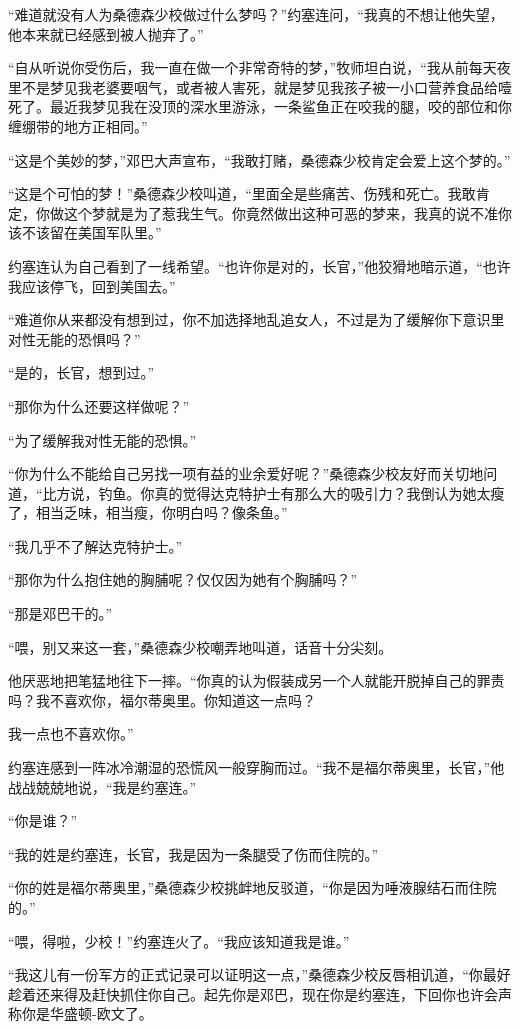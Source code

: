     “难道就没有人为桑德森少校做过什么梦吗？”约塞连问，“我真的不想让他失望，他本来就已经感到被人抛弃了。”

    “自从听说你受伤后，我一直在做一个非常奇特的梦，”牧师坦白说，“我从前每天夜里不是梦见我老婆要咽气，或者被人害死，就是梦见我孩子被一小口营养食品给噎死了。最近我梦见我在没顶的深水里游泳，一条鲨鱼正在咬我的腿，咬的部位和你缠绷带的地方正相同。”

    “这是个美妙的梦，”邓巴大声宣布，“我敢打赌，桑德森少校肯定会爱上这个梦的。”

    “这是个可怕的梦！”桑德森少校叫道，“里面全是些痛苦、伤残和死亡。我敢肯定，你做这个梦就是为了惹我生气。你竟然做出这种可恶的梦来，我真的说不准你该不该留在美国军队里。”

    约塞连认为自己看到了一线希望。“也许你是对的，长官，”他狡猾地暗示道，“也许我应该停飞，回到美国去。”

    “难道你从来都没有想到过，你不加选择地乱追女人，不过是为了缓解你下意识里对性无能的恐惧吗？”

    “是的，长官，想到过。”

    “那你为什么还要这样做呢？”

    “为了缓解我对性无能的恐惧。”

    “你为什么不能给自己另找一项有益的业余爱好呢？”桑德森少校友好而关切地问道，“比方说，钓鱼。你真的觉得达克特护士有那么大的吸引力？我倒认为她太瘦了，相当乏味，相当瘦，你明白吗？像条鱼。”

    “我几乎不了解达克特护士。”

    “那你为什么抱住她的胸脯呢？仅仅因为她有个胸脯吗？”

    “那是邓巴干的。”

    “喂，别又来这一套，”桑德森少校嘲弄地叫道，话音十分尖刻。

    他厌恶地把笔猛地往下一摔。“你真的认为假装成另一个人就能开脱掉自己的罪责吗？我不喜欢你，福尔蒂奥里。你知道这一点吗？

    我一点也不喜欢你。”

    约塞连感到一阵冰冷潮湿的恐慌风一般穿胸而过。“我不是福尔蒂奥里，长官，”他战战兢兢地说，“我是约塞连。”

    “你是谁？”

    “我的姓是约塞连，长官，我是因为一条腿受了伤而住院的。”

    “你的姓是福尔蒂奥里，”桑德森少校挑衅地反驳道，“你是因为唾液腺结石而住院的。”

    “喂，得啦，少校！”约塞连火了。“我应该知道我是谁。”

    “我这儿有一份军方的正式记录可以证明这一点，”桑德森少校反唇相讥道，“你最好趁着还来得及赶快抓住你自己。起先你是邓巴，现在你是约塞连，下回你也许会声称你是华盛顿-欧文了。

